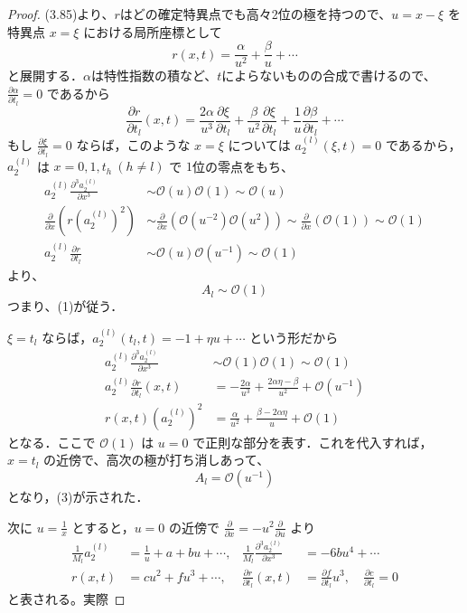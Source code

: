 \begin{story}
\begin{proof}
(3.85)より、$r$はどの確定特異点でも高々2位の極を持つので、$u=x-\xi$ を特異点 $x=\xi$ における局所座標として
\[
    r(x,t) = \frac{\alpha}{u^2} + \frac{\beta}{u} + \cdots
\]
と展開する．$\alpha$は特性指数の積など、$t$によらないものの合成で書けるので、$\frac{\partial \alpha}{\partial t_l}=0$ であるから
\[
    \frac{\partial r}{\partial t_l}(x,t) = \frac{2\alpha}{u^3}\frac{\partial \xi}{\partial t_l} + \frac{\beta}{u^2}\frac{\partial \xi}{\partial t_l} + \frac{1}{u}\frac{\partial \beta}{\partial t_l}+\cdots
\]
もし $\frac{\partial \xi}{\partial t_l}=0$ ならば，このような $x=\xi$ については $a_2^{(l)}(\xi,t)=0$ であるから，
$a_2^{(l)}$ は $x = 0, 1, t_h \ (h \neq l)$ で $1$位の零点をもち、
\begin{align*}
    a_2^{(l)} \frac{\partial^3 a_2^{(l)}}{\partial x^3} &\sim \mathcal{O}(u) \mathcal{O}(1) \sim \mathcal{O}(u) \\[8pt]
    \frac{\partial}{\partial x} \left( r (a_2^{(l)})^2 \right) &\sim \frac{\partial}{\partial x} \left( \mathcal{O}(u^{-2}) \mathcal{O}(u^2) \right) \sim \frac{\partial}{\partial x} (\mathcal{O}(1)) \sim \mathcal{O}(1) \\[8pt]
    a_2^{(l)} \frac{\partial r}{\partial t_l} &\sim \mathcal{O}(u) \mathcal{O}(u^{-1}) \sim \mathcal{O}(1)
\end{align*}
より、
\begin{equation*}
    A_l \sim \mathcal{O}(1)
\end{equation*}
つまり、(1)が従う．

$\xi=t_l$ ならば，$a_2^{(l)}(t_l,t)=-1+\eta u+\cdots$ という形だから
\begin{align*}
    a_2^{(l)} \frac{\partial^3 a_2^{(l)}}{\partial x^3} &\sim \mathcal{O}(1) \mathcal{O}(1) \sim \mathcal{O}(1) \\
    a_2^{(l)} \frac{\partial r}{\partial t_l}(x,t) &= -\frac{2\alpha}{u^3} + \frac{2\alpha\eta-\beta}{u^2} + \mathcal{O}(u^{-1}) \\
    r(x,t)\left(a_2^{(l)}\right)^2 &= \frac{\alpha}{u^2} + \frac{\beta-2\alpha\eta}{u} + \mathcal{O}(1)
\end{align*}
となる．ここで $\mathcal{O}(1)$ は $u=0$ で正則な部分を表す．これを代入すれば，$x=t_l$ の近傍で、高次の極が打ち消しあって、
\[
    A_l = \mathcal{O}(u^{-1})
\]
となり，(3)が示された．

次に $u=\frac{1}{x}$ とすると，$u=0$ の近傍で $\frac{\partial}{\partial x}=-u^2 \frac{\partial}{\partial u}$ より
\begin{align*}
    \frac{1}{M_l}a_2^{(l)} &= \frac{1}{u}+a+bu+\cdots, & \frac{1}{M_l}\frac{\partial^3 a_2^{(l)}}{\partial x^3} &= -6bu^4+\cdots \\
    r(x,t) &= cu^2+fu^3+\cdots, & \frac{\partial r}{\partial t_l}(x,t) &= \frac{\partial f}{\partial t_l}u^3, \quad \frac{\partial c}{\partial t_l}=0
\end{align*}
と表される。実際


\end{proof}
\end{story}
